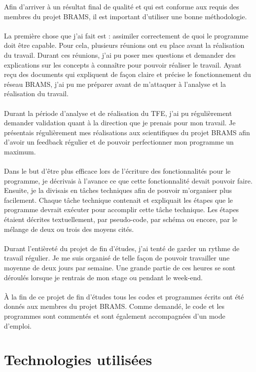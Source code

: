 \documentclass[11pt]{article}
\begin{document}
Afin d'arriver à un résultat final de qualité et qui est conforme aux requis des membres du projet BRAMS, il est important d'utiliser une bonne méthodologie.\\
\\
La première chose que j'ai fait est : assimiler correctement de quoi le programme doit être capable.
Pour cela, plusieurs réunions ont eu place avant la réalisation du travail.
Durant ces réunions, j'ai pu poser mes questions et demander des explications sur les concepts à connaître pour pouvoir réaliser le travail.
Ayant reçu des documents qui expliquent de façon claire et précise le fonctionnement du réseau BRAMS, j'ai pu me préparer avant de m'attaquer à l'analyse et la réalisation du travail.\\
\\
Durant la période d'analyse et de réalisation du TFE, j'ai pu régulièrement demander validation quant à la direction que je prenais pour mon travail.
Je présentais régulièrement mes réalisations aux scientifiques du projet BRAMS afin d'avoir un feedback régulier et de pouvoir perfectionner mon programme un maximum.\\
\\
Dans le but d'être plus efficace lors de l'écriture des fonctionnalités pour le programme, je décrivais à l'avance ce que cette fonctionnalité devait pouvoir faire.
Ensuite, je la divisais en tâches techniques afin de pouvoir m'organiser plus facilement.
Chaque tâche technique contenait et expliquait les étapes que le programme devrait exécuter pour accomplir cette tâche technique.
Les étapes étaient décrites textuellement, par pseudo-code, par schéma ou encore, par le mélange de deux ou trois des moyens cités.\\
\\
Durant l'entièreté du projet de fin d'études, j'ai tenté de garder un rythme de travail régulier.
Je me suis organisé de telle façon de pouvoir travailler une moyenne de deux jours par semaine.
Une grande partie de ces heures se sont déroulés lorsque je rentrais de mon stage ou pendant le week-end.\\
\\
À la fin de ce projet de fin d'études tous les codes et programmes écrits ont été donnés aux membres du projet BRAMS.
Comme demandé, le code et les programmes sont commentés et sont également accompagnées d'un mode d'emploi.

\newpage

\section{Technologies utilisées}
\end{document}
